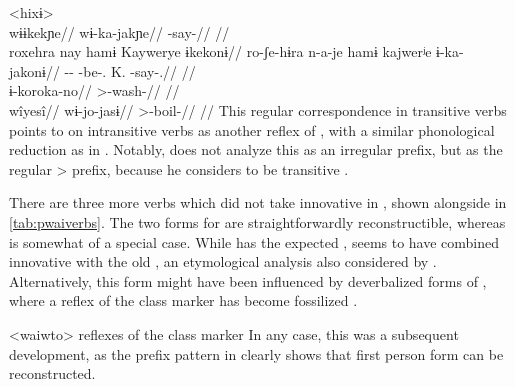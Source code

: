 \pex<hixɨ>
 \waiwai \parencite[][71]{waiwaihawkins1998}\\
\begingl
\glpreamble wɨɨkekɲe//
\gla wɨ-ka-jakɲe//
\glb {}-say-//
\glft {}//
\endgl
{} \hixka \parencite[][124]{hixkaryanaderby1985}\\
\begingl
\glpreamble roxehra nay hamɨ Kaywerye ɨkekonɨ//
\gla ro-ʃe-hɨra n-a-je hamɨ kajwerʲe ɨ-ka-jakonɨ//
\glb {}-- -be-.  K. -say-.//
\glft {}//
\endgl
{} \hixka \parencite[][191]{hixkaryanaderby1985}\\
\begingl
\gla ɨ-koroka-no//
\glb {}>-wash-//
\glft {}//
\endgl
{} \waiwai \parencite[][192]{waiwaihawkins1998}\\
\begingl
\glpreamble wîyesî//
\gla wɨ-jo-jasɨ//
\glb {}>-boil-//
\glft {}//
\endgl
\xe
%
This regular correspondence in transitive verbs points to \hixka {} on intransitive verbs as another reflex of , with a similar phonological reduction as in \ikpeng {}.
Notably, \textcite{hixkaryanaderby1985} does not analyze this  as an irregular  prefix, but as the regular > prefix, because he considers \hixka {}  to be transitive .

There are three more verbs which did not take innovative  in \PWai, shown alongside   in \cref{tab:pwaiverbs}.
The two forms for  are straightforwardly reconstructible, whereas  is somewhat of a special case.
While \hixka has the expected , \waiwai seems to have combined innovative  with the old , an etymological analysis also considered by \textcite[90]{gildea1998}.
Alternatively, this form might have been influenced by deverbalized forms of , where a reflex of the  class marker  has become fossilized .

\pex<waiwto> \waiwai reflexes of the  class marker 
\a {}  \parencite[92]{waiwaihawkins1998}
\a {}  \parencite[165]{waiwaihawkins1998}
\a {}  \parencite[204]{waiwaihawkins1998}
\xe
%
In any case, this was a subsequent development, as the prefix pattern in \hixka {} clearly shows that \PWai first person form  can be reconstructed.

